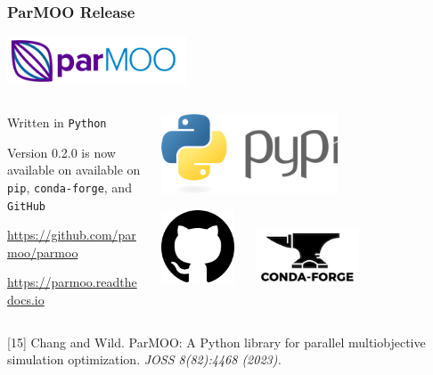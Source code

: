 \documentclass[aspectratio=169]{beamer}
\begin{document}
\begin{frame}\frametitle{ParMOO Release}

\begin{center}
\includegraphics[width=0.4\textwidth]{../img/logos/logo-parmoo.png}
\end{center}

\begin{columns}
\begin{column}{0.7\textwidth}

Written in {\tt Python}

\bigskip

Version 0.2.0 is now available on
available on {\tt pip}, {\tt conda-forge}, and {\tt GitHub}

\bigskip
\bigskip
\url{https://github.com/parmoo/parmoo}

\bigskip

\url{https://parmoo.readthedocs.io}
\end{column}
\begin{column}{0.2\textwidth}
\begin{center}
\includegraphics[width=0.6\textwidth]{../img/logos/logo-py.png}

\bigskip

\includegraphics[width=0.25\textwidth]{../img/logos/logo-gh.png}
$\quad$
\includegraphics[width=0.35\textwidth]{../img/logos/logo-conda.png}
\end{center}
\end{column}
\end{columns}

\bigskip
\bigskip

{\tiny
[15] Chang and Wild.
ParMOO: A Python library for parallel multiobjective simulation optimization.
{\sl JOSS 8(82):4468 (2023).}
}

\end{frame}
\end{document}
